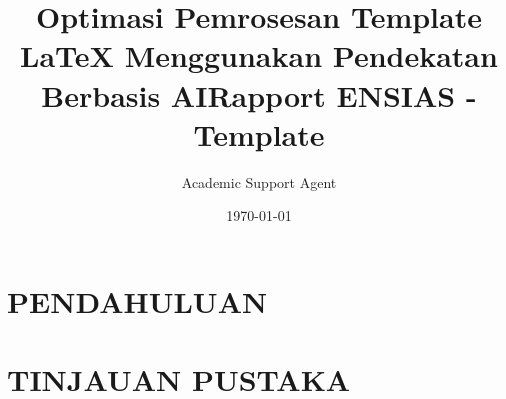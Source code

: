 \documentclass{rapportENSIAS}
\title{Optimasi Pemrosesan Template LaTeX Menggunakan Pendekatan Berbasis AI}
\author{Academic Support Agent}
\date{\today}
\begin{document}
\maketitle

\begin{abstract}

\end{abstract}

\chapter{PENDAHULUAN}


\chapter{TINJAUAN PUSTAKA}


\usepackage{lipsum}
\usepackage{minted}

\usepackage{titlesec} %
\usepackage{tocloft} %
\usepackage{hyperref} %


\title{Rapport ENSIAS - Template} %
\end{document}
